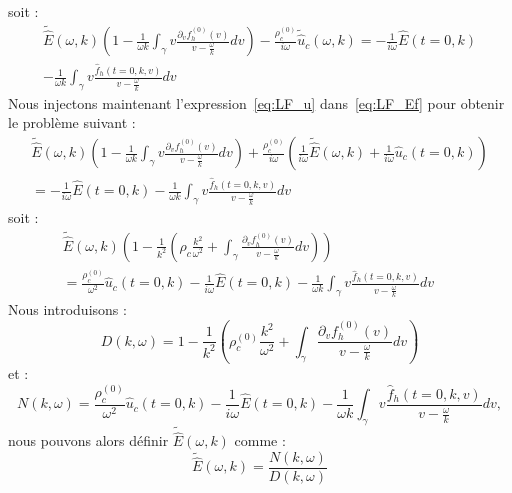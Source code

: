 soit :
\begin{equation}
  \begin{aligned}
    \tilde{\hat{E}}(\omega,k)\left(1-\frac{1}{\omega k}\int_\gamma v\frac{\partial_vf_h^{(0)}(v)}{v-\frac{\omega}{k}}dv\right)-\frac{\rho_c^{(0)}}{i\omega}\tilde{\hat{u}}_c(\omega,k)=-\frac{1}{i\omega}\hat{E}(t=0,k)\nonumber\\
    -\frac{1}{\omega k}\int_\gamma v\frac{\hat{f}_h(t=0,k,v)}{v-\frac{\omega}{k}}dv
  \end{aligned}
  \label{eq:LF_Ef}
\end{equation}
Nous injectons maintenant l'expression~\eqref{eq:LF_u} dans~\eqref{eq:LF_Ef} pour obtenir le problème suivant :
$$
  \begin{aligned}
    \tilde{\hat{E}}(\omega,k)\left(1-\frac{1}{\omega k}\int_\gamma v\frac{\partial_vf_h^{(0)}(v)}{v-\frac{\omega}{k}}dv\right)+\frac{\rho_c^{(0)}}{i\omega}\left(\frac{1}{i\omega}\tilde{\hat{E}}(\omega,k)+\frac{1}{i\omega}\hat{u}_c(t=0,k)\right)\\
    =-\frac{1}{i\omega}\hat{E}(t=0,k)
    -\frac{1}{\omega k}\int_\gamma v\frac{\hat{f}_h(t=0,k,v)}{v-\frac{\omega}{k}}dv
  \end{aligned}
$$
soit :
$$
  \begin{aligned}
    \tilde{\hat{E}}(\omega,k)\left(1-\frac{1}{k^2}\left(\rho_c\frac{k^2}{\omega^2}+\int_\gamma \frac{\partial_vf_h^{(0)}(v)}{v-\frac{\omega}{k}}dv\right)\right)~~~~~~~~~~~~~~~~~~~~~~~~~~~~~~~~~~~~~~~~\\
    =\frac{\rho_c^{(0)}}{\omega^2}\hat{u}_c(t=0,k)-\frac{1}{i\omega}\hat{E}(t=0,k)
    -\frac{1}{\omega k}\int_\gamma v\frac{\hat{f}_h(t=0,k,v)}{v-\frac{\omega}{k}}dv
  \end{aligned}
$$
Nous introduisons :
\begin{equation}
  D(k,\omega) = 1-\frac{1}{k^2}\left( \rho_c^{(0)}\frac{k^2}{\omega^2}+\int_\gamma \frac{\partial_vf_h^{(0)}(v)}{v-\frac{\omega}{k}}dv\right )
  \label{eq:relD_H}
\end{equation}
et :
\begin{equation}
  N(k,\omega) = \frac{\rho_c^{(0)}}{\omega^2}\hat{u}_c(t=0,k)-\frac{1}{i\omega}\hat{E}(t=0,k) 
    -\frac{1}{\omega k}\int_\gamma v\frac{\hat{f}_h(t=0,k,v)}{v-\frac{\omega}{k}}dv,
  \label{eq:relN_H}
\end{equation}
nous pouvons alors définir $\tilde{\hat{E}}(\omega,k)$ comme :
$$
  \tilde{\hat{E}}(\omega,k)=\frac{N(k,\omega)}{D(k,\omega)}
$$

